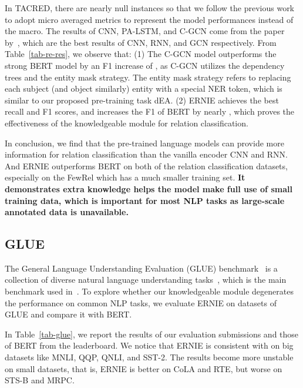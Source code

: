 \documentclass[11pt,a4paper]{article}
\begin{document}
In TACRED, there are nearly  null instances so that we follow the previous work~\cite{zhang2017position} to adopt micro averaged metrics to represent the model performances instead of the macro.
The results of CNN, PA-LSTM, and C-GCN come from the paper by~, which are the best results of CNN, RNN, and GCN respectively. From Table~\ref{tab-re-res}, we observe that: (1) The C-GCN model outperforms the strong BERT model by an F1 increase of , as C-GCN utilizes the dependency trees and the entity mask strategy. The entity mask strategy refers to replacing each subject (and object similarly) entity with a special NER token, which is similar to our proposed pre-training task dEA. (2) ERNIE achieves the best recall and F1 scores, and increases the F1 of BERT by nearly , which proves the effectiveness of the knowledgeable module for relation classification. 



In conclusion, we find that the pre-trained language models can provide more information for relation classification than the vanilla encoder CNN and RNN. And ERNIE outperforms BERT on both of the relation classification datasets, especially on the FewRel which has a much smaller training set. \textbf{It demonstrates extra knowledge helps the model make full use of small training data, which is important for most NLP tasks as large-scale annotated data is unavailable.}





\subsection{GLUE}

The General Language Understanding Evaluation (GLUE) benchmark~\cite{wang2018glue} is a collection of diverse natural language understanding tasks~\cite{warstadt2018neural, socher2013recursive, dolan2005automatically, agirre2007semantic, williams2018broad, rajpurkar2016squad, dagan2006pascal, levesque2011winograd}, which is the main benchmark used in~. To explore whether our knowledgeable module degenerates the performance on common NLP tasks, we evaluate ERNIE on  datasets of GLUE and compare it with BERT.

In Table~\ref{tab-glue}, we report the results of our evaluation submissions and those of BERT from the leaderboard. We notice that ERNIE is consistent with  on big datasets like MNLI, QQP, QNLI, and SST-2. The results become more unstable on small datasets, that is, ERNIE is better on CoLA and RTE, but worse on STS-B and MRPC.
\end{document}
